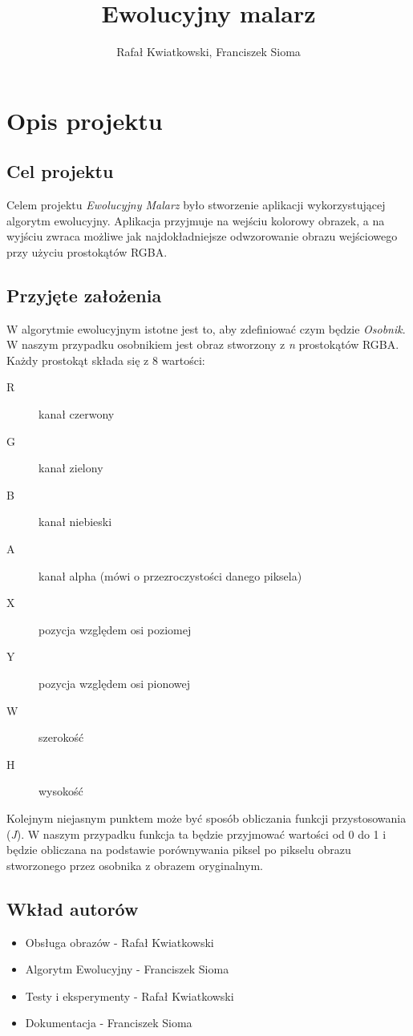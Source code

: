\documentclass{article}
\title{Ewolucyjny malarz }%
\author{Rafał Kwiatkowski, Franciszek Sioma}
\begin{document}
\maketitle

\section{Opis projektu}
\subsection{Cel projektu}
Celem projektu {\it Ewolucyjny Malarz} było stworzenie aplikacji wykorzystującej algorytm ewolucyjny. Aplikacja przyjmuje na wejściu kolorowy obrazek, a na wyjściu zwraca możliwe jak najdokładniejsze odwzorowanie obrazu wejściowego przy użyciu prostokątów RGBA. 

\subsection{Przyjęte założenia}
W algorytmie ewolucyjnym istotne jest to, aby zdefiniować czym będzie {\it Osobnik}. W naszym przypadku osobnikiem jest obraz stworzony z {\it n} prostokątów RGBA. Każdy prostokąt składa się z 8 wartości: 
\begin{description}
    \item[R] kanał czerwony
    \item[G] kanał zielony
    \item[B] kanał niebieski
    \item[A] kanał alpha (mówi o przezroczystości danego piksela)
    \item[X] pozycja względem osi poziomej
    \item[Y] pozycja względem osi pionowej
    \item[W] szerokość
    \item[H] wysokość       
\end{description}

Kolejnym niejasnym punktem może być sposób obliczania funkcji przystosowania ({\it J}). W naszym przypadku funkcja ta będzie przyjmować wartości od 0 do 1 i będzie obliczana na podstawie porównywania piksel po pikselu obrazu stworzonego przez osobnika z obrazem oryginalnym.
\subsection{Wkład autorów}
\begin{itemize}
    \item Obsługa obrazów - Rafał Kwiatkowski
    \item Algorytm Ewolucyjny - Franciszek Sioma
    \item Testy i eksperymenty - Rafał Kwiatkowski
    \item Dokumentacja - Franciszek Sioma
\end{itemize}
\end{document}
